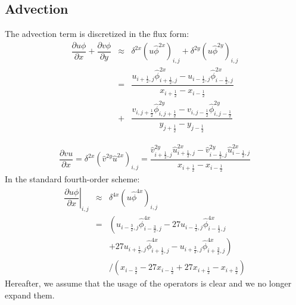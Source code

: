 \documentclass[gmd]{copernicus}
\begin{document}
\subsection{Advection}
The advection term is discretized in the flux form:
\begin{eqnarray}
\nonumber
\dfrac{\partial u \phi}{\partial x} + \dfrac{\partial v \phi}{\partial y} & \approx & 
\delta^{2x} \left( u \widehat{\phi}^{2x} \right)_{i,j} + \delta^{2y} \left( u \widehat{\phi}^{2y} \right)_{i,j} \\ 
& = & \dfrac{ u_{i+\frac{1}{2},j} \widehat{\phi}^{2x}_{i+\frac{1}{2},j} - u_{i-\frac{1}{2},j} \widehat{\phi}^{2x}_{i-\frac{1}{2},j} }
            { x_{i+\frac{1}{2}} - x_{i-\frac{1}{2}} }\\
& + & \dfrac{ v_{i,j+\frac{1}{2}} \widehat{\phi}^{2y}_{i,j+\frac{1}{2}} - v_{i,j-\frac{1}{2}} \widehat{\phi}^{2y}_{i,j-\frac{1}{2}} }
            { y_{j+\frac{1}{2}} - y_{j-\frac{1}{2}} }
\end{eqnarray}

\begin{eqnarray}
\dfrac{\partial v u}{\partial x} = \delta^{2x} \left( \widehat{v}^{2y} \widehat{u}^{2x} \right)_{i,j} =
\dfrac{ \widehat{v}^{2y}_{i+\frac{1}{2},j} \widehat{u}^{2x}_{i+\frac{1}{2},j} - \widehat{v}^{2y}_{i-\frac{1}{2},j} \widehat{u}^{2x}_{i-\frac{1}{2},j} }
      { x_{i+\frac{1}{2}} - x_{i-\frac{1}{2}} }\label{eq:advec2u}
\end{eqnarray}
In the standard fourth-order scheme:
\begin{eqnarray}
\nonumber
\left. \dfrac{\partial u \phi}{\partial x} \right|_{i,j} & \approx & \delta^{4x} \left( u \widehat{\phi}^{4x} \right)_{i,j} \\
\nonumber
& = & \left( u_{i-\frac{3}{2},j} \widehat{\phi}^{4x}_{i-\frac{3}{2},j} - 27 u_{i-\frac{1}{2},j} \widehat{\phi}^{4x}_{i-\frac{1}{2},j} \right.\\
\nonumber
&   &\left. + 27 u_{i+\frac{1}{2},j} \widehat{\phi}^{4x}_{i+\frac{1}{2},j} - u_{i+\frac{3}{2},j} \widehat{\phi}^{4x}_{i+\frac{3}{2},j} \right)\\
&   &\slash \left( x_{i-\frac{3}{2}} - 27 x_{i-\frac{1}{2}} + 27 x_{i+\frac{1}{2}} - x_{i+\frac{3}{2}} \right)
\end{eqnarray}
Hereafter, we assume that the usage of the operators is clear and we no longer expand them.
\end{document}
